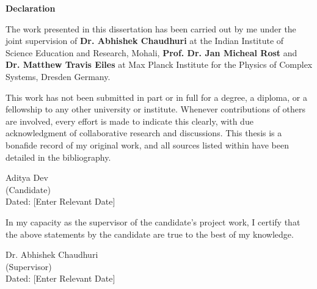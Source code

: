 \begin{center}
    \textbf{\Large Declaration}
\end{center}
The work presented in this dissertation has been carried out by me under the joint supervision of 
\textbf{Dr. Abhishek Chaudhuri} at the Indian Institute of Science Education and Research, Mohali, 
\textbf{Prof. Dr.  Jan Micheal Rost} and \textbf{Dr. Matthew Travis Eiles} at Max Planck Institute for the Physics of Complex Systems, Dresden Germany. 

\vspace{0.4cm}

This work has not been submitted in part or in full for a degree, a diploma, or a fellowship to any other university or institute. Whenever contributions of others are involved, every effort is made to indicate this clearly, with due acknowledgment of collaborative research and discussions. This thesis is a bonafide record of my original work, and all sources listed within have been detailed in the bibliography.

\vspace{2cm}

\begin{flushright}
Aditya Dev
\\
(Candidate)
\\
Dated: [Enter Relevant Date]
\end{flushright}

In my capacity as the supervisor of the candidate's project work, I certify that the above statements by the candidate are true to the best of my knowledge.

\vspace{2cm}

\begin{flushright}
Dr. Abhishek Chaudhuri
\\
(Supervisor)
\\
Dated: [Enter Relevant Date]
\end{flushright}
